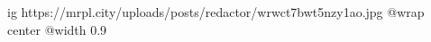  
 
 
 
 

\ifcmt
  ig https://mrpl.city/uploads/posts/redactor/wrwct7bwt5nzy1ao.jpg
  @wrap center
  @width 0.9
\fi

